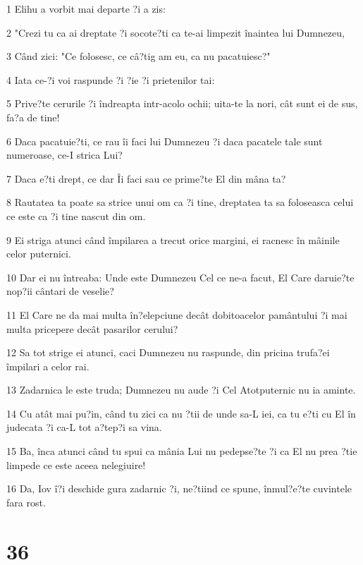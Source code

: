 \par 1 Elihu a vorbit mai departe ?i a zis:
\par 2 "Crezi tu ca ai dreptate ?i socote?ti ca te-ai limpezit înaintea lui Dumnezeu,
\par 3 Când zici: "Ce folosesc, ce câ?tig am eu, ca nu pacatuiesc?"
\par 4 Iata ce-?i voi raspunde ?i ?ie ?i prietenilor tai:
\par 5 Prive?te cerurile ?i îndreapta intr-acolo ochii; uita-te la nori, cât sunt ei de sus, fa?a de tine!
\par 6 Daca pacatuie?ti, ce rau îi faci lui Dumnezeu ?i daca pacatele tale sunt numeroase, ce-I strica Lui?
\par 7 Daca e?ti drept, ce dar Îi faci sau ce prime?te El din mâna ta?
\par 8 Rautatea ta poate sa strice unui om ca ?i tine, dreptatea ta sa foloseasca celui ce este ca ?i tine nascut din om.
\par 9 Ei striga atunci când împilarea a trecut orice margini, ei racnesc în mâinile celor puternici.
\par 10 Dar ei nu întreaba: Unde este Dumnezeu Cel ce ne-a facut, El Care daruie?te nop?ii cântari de veselie?
\par 11 El Care ne da mai multa în?elepciune decât dobitoacelor pamântului ?i mai multa pricepere decât pasarilor cerului?
\par 12 Sa tot strige ei atunci, caci Dumnezeu nu raspunde, din pricina trufa?ei împilari a celor rai.
\par 13 Zadarnica le este truda; Dumnezeu nu aude ?i Cel Atotputernic nu ia aminte.
\par 14 Cu atât mai pu?in, când tu zici ca nu ?tii de unde sa-L iei, ca tu e?ti cu El în judecata ?i ca-L tot a?tep?i sa vina.
\par 15 Ba, înca atunci când tu spui ca mânia Lui nu pedepse?te ?i ca El nu prea ?tie limpede ce este aceea nelegiuire!
\par 16 Da, Iov î?i deschide gura zadarnic ?i, ne?tiind ce spune, înmul?e?te cuvintele fara rost.

\chapter{36}

